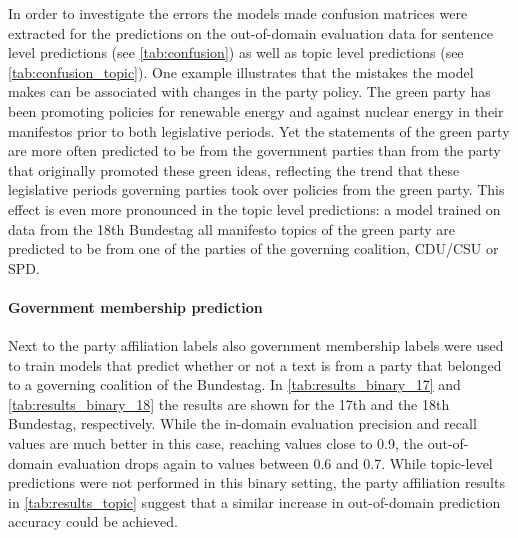 \documentclass[runningheads,a4paper]{llncs}
\begin{document}
In order to investigate the errors the models made confusion matrices were extracted for the predictions on the out-of-domain evaluation data for sentence level predictions (see \autoref{tab:confusion}) as well as topic level predictions (see \autoref{tab:confusion_topic}). One example illustrates that the mistakes the model makes can be associated with changes in the party policy. The green party has been promoting policies for renewable energy and against nuclear energy in their manifestos prior to both legislative periods. Yet the statements of the green party are more often predicted to be from the government parties than from the party that originally promoted these green ideas, reflecting the trend that these legislative periods governing parties took over policies from the green party. This effect is even more pronounced in the topic level predictions: a model trained on data from the 18th Bundestag all manifesto topics of the green party are predicted to be from one of the parties of the governing coalition, CDU/CSU or SPD. \\

\paragraph{Government membership prediction} Next to the party affiliation labels also government membership labels were used to train models that predict whether or not a text is from a party that belonged to a governing coalition of the Bundestag. In \autoref{tab:results_binary_17} and \autoref{tab:results_binary_18} the results are shown for the 17th and the 18th Bundestag, respectively. While the in-domain evaluation precision and recall values are much better in this case, reaching values close to 0.9, the out-of-domain evaluation drops again to values between 0.6 and 0.7. While topic-level predictions were not performed in this binary setting, the party affiliation results in \autoref{tab:results_topic} suggest that a similar increase in out-of-domain prediction accuracy could be achieved. 
\end{document}

